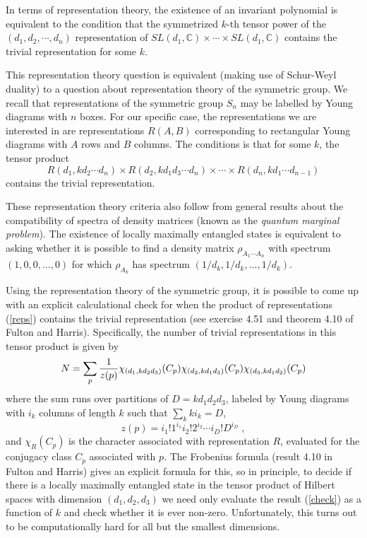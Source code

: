 \documentclass[12pt]{article}
\theoremstyle{definition}
\newcommand{\be}{\begin{equation}}
\newcommand{\ee}{\end{equation}}
\begin{document}
In terms of representation theory, the existence of an invariant polynomial is equivalent to the condition that the symmetrized $k$-th tensor power of the $(d_1,d_2,\cdots, d_n)$ representation of $SL(d_1, \mathbb{C}) \times \cdots \times SL(d_1, \mathbb{C})$ contains the trivial representation for some $k$.

This representation theory question is equivalent (making use of Schur-Weyl duality) to a question about representation theory of the symmetric group. We recall that representations of the symmetric group $S_n$ may be labelled by Young diagrams with $n$ boxes. For our specific case, the representations we are interested in are representations $R(A,B)$ corresponding to rectangular Young diagrams with $A$ rows and $B$ columns. The conditions is that for some $k$, the tensor product
\be
\label{reps}
R(d_1, k d_2 \cdots d_n) \times R(d_2, k d_1 d_3 \cdots d_n) \times \cdots \times R(d_n, k d_1 \cdots d_{n-1})
\ee
contains the trivial representation.

These representation theory criteria also follow from general results about the compatibility of spectra of density matrices (known as the {\it quantum marginal problem}). The existence of locally maximally entangled states is equivalent to asking whether it is possible to find a density matrix $\rho_{A_1 \cdots A_n}$ with spectrum $(1,0,0,\dots,0)$ for which $\rho_{A_k}$ has spectrum $(1/d_k,1/d_k, \dots, 1/d_k)$.

Using the representation theory of the symmetric group, it is possible to come up with an explicit calculational check for when the product of representations (\ref{reps}) contains the trivial representation (see exercise 4.51 and theorem 4.10 of Fulton and Harris). Specifically, the number of trivial representations in this tensor product is given by
\be
\label{check}
N = \sum_p {1 \over z(p)} \chi_{(d_1, k d_2 d_3)}(C_p) \chi_{(d_2, k d_1 d_3)}(C_p) \chi_{(d_3, k d_1 d_2)}(C_p)
\ee
where the sum runs over partitions of $D = k d_1 d_2 d_3$, labeled by Young diagrams with $i_k$ columns of length $k$  such that $\sum_k k i_k = D$,
\be
z(p) = i_1!1^{i_1} i_2! 2^{i_2} \cdots i_D! D^{i_D} \; ,
\ee
and $\chi_R(C_p)$ is the character associated with representation $R$, evaluated for the conjugacy class $C_p$ associated with $p$. The Frobenius formula (result 4.10 in Fulton and Harris) gives an explicit formula for this, so in principle, to decide if there is a locally maximally entangled state in the tensor product of Hilbert spaces with dimension $(d_1,d_2,d_3)$ we need only evaluate the result (\ref{check}) as a function of $k$ and check whether it is ever non-zero. Unfortunately, this turns out to be computationally hard for all but the smallest dimensions.
\end{document}
